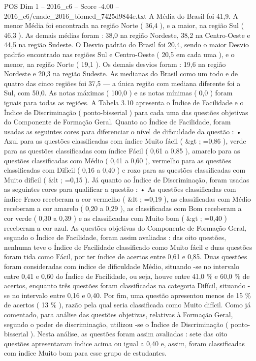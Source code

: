 \begin{textsample}{POS Dim 1 – 2016\_c6 – Score -4.00 – 2016\_c6/enade\_2016\_biomed\_7425d9844e.txt}
A Média do Brasil foi 41,9.
A menor Média foi encontrada na região Norte ( 36,4 ), e a maior, na região Sul ( 46,3 ).
As demais médias foram : 38,0 na região Nordeste, 38,2 na Centro-Oeste e 44,5 na região Sudeste.
O Desvio padrão do Brasil foi 20,4, sendo o maior Desvio padrão encontrado nas regiões Sul e Centro-Oeste ( 20,5 em cada uma ), e o menor, na região Norte ( 19,1 ).
Os demais desvios foram : 19,6 na região Nordeste e 20,3 na região Sudeste.
As medianas do Brasil como um todo e de quatro das cinco regiões foi 37,5 — a única região com mediana diferente foi a Sul, com 50,0.
As notas máximas ( 100,0 ) e as notas mínimas ( 0,0 ) foram iguais para todas as regiões.
A Tabela 3.10 apresenta o Índice de Facilidade e o Índice de Discriminação ( ponto-bisserial ) para cada uma das questões objetivas do Componente de Formação Geral.
Quanto ao Índice de Facilidade, foram usadas as seguintes cores para diferenciar o nível de dificuldade da questão : • Azul para as questões classificadas com índice Muito fácil ( \&gt ; =0,86 ), verde para as questões classificadas com índice Fácil ( 0,61 a 0,85 ), amarelo para as questões classificadas com Médio ( 0,41 a 0,60 ), vermelho para as questões classificadas com Difícil ( 0,16 a 0,40 ) e roxo para as questões classificadas com Muito difícil ( \&lt ; =0,15 ).
Já quanto ao Índice de Discriminação, foram usadas as seguintes cores para qualificar a questão : • As questões classificadas com índice Fraco receberam a cor vermelho ( \&lt ; =0,19 ), as classificadas com Médio receberam a cor amarelo ( 0,20 a 0,29 ), as classificadas com Bom receberam a cor verde ( 0,30 a 0,39 ) e as classificadas com Muito bom ( \&gt ; =0,40 ) receberam a cor azul.
As questões objetivas do Componente de Formação Geral, segundo o Índice de Facilidade, foram assim avaliadas : das oito questões, nenhuma teve o Índice de Facilidade classificado como Muito fácil e duas questões foram tida como Fácil, por ter índice de acertos entre 0,61 e 0,85.
Duas questões foram consideradas com índice de dificuldade Médio, situando -se no intervalo entre 0,41 e 0,60 do Índice de Facilidade, ou seja, houve entre 41,0 \% e 60,0 \% de acertos, enquanto três questões foram classificadas na categoria Difícil, situando -se no intervalo entre 0,16 e 0,40.
Por fim, uma questão apresentou menos de 15 \% de acertos ( 13 \% ), razão pela qual seria classificada como Muito difícil.
Como já comentado, para análise das questões objetivas, relativas à Formação Geral, segundo o poder de discriminação, utilizou -se o Índice de Discriminação ( ponto-bisserial ).
Nesta análise, as questões foram assim avaliadas : sete das oito questões apresentaram índice acima ou igual a 0,40 e, assim, foram classificadas com índice Muito bom para esse grupo de estudantes.

\end{textsample}

